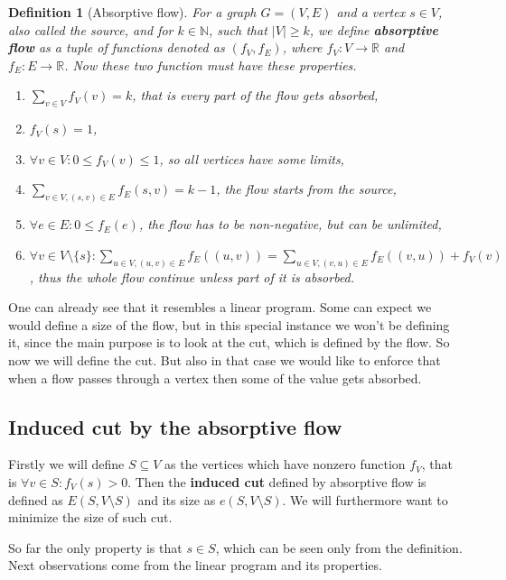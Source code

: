 \documentclass{article}
\theoremstyle{plain}
\theoremstyle{plain}
\newtheorem{defn}{Definition}
\theoremstyle{remark}
\begin{document}
	\begin{defn}[Absorptive flow]
		For a graph $G = (V,E)$ and a vertex $s \in V$, also called the \textit{source}, and for $k \in \mathbb{N}$, such that $|V| \geq k$, we define \textbf{absorptive flow} as a tuple of functions denoted as $(f_V, f_E)$, where $f_V : V \to \mathbb{R}$ and $f_E : E \to \mathbb{R}$. Now these two function must have these properties.
		
		\begin{enumerate}
			\item $\sum_{v \in V} f_V (v) = k$, that is every part of the flow gets absorbed,
			\item $f_V(s) = 1$,
			\item $\forall v \in V : 0 \leq f_V(v) \leq 1$, so all vertices have some limits,
			\item $\sum_{v \in V, (s,v) \in E} f_E(s,v) = k-1$, the flow starts from the source,
			\item $\forall e \in E : 0 \leq f_E(e)$, the flow has to be non-negative, but can be unlimited,
			\item $\forall v \in V \setminus \{s\}: \sum_{u \in V, (u,v) \in E} f_E((u,v)) = \sum_{u \in V, (v,u) \in E} f_E((v,u)) + f_V(v)$, thus the whole flow continue unless part of it is absorbed.
		\end{enumerate}
	\end{defn}
	
	One can already see that it resembles a linear program. Some can expect we would define a size of the flow, but in this special instance we won't be defining it, since the main purpose is to look at the cut, which is defined by the flow. So now we will define the cut. But also in that case we would like to enforce that when a flow passes through a vertex then some of the value gets absorbed.
	
	\subsection{Induced cut by the absorptive flow}
	
	Firstly we will define $S \subseteq V$ as the vertices which have nonzero function $f_V$, that is $\forall v \in S : f_V(s) > 0$. Then the \textbf{induced cut} defined by absorptive flow is defined as $E(S, V \setminus S)$ and its size as $e(S, V \setminus S)$. We will furthermore want to minimize the size of such cut.
	
	So far the only property is that $s \in S$, which can be seen only from the definition. Next observations come from the linear program and its properties.
	
\end{document}
